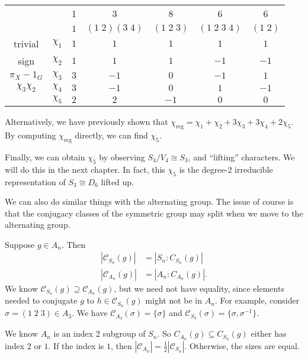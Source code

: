 \documentclass[a4paper]{article}
\begin{document}
\begin{eg}
\begin{center}
    \begin{tabular}{ccccccc}
      \toprule
      & & 1 & 3 & 8 & 6 & 6\\
      & & $1$ & $(1\; 2)(3\; 4)$ & $(1\; 2\; 3)$ & $(1\; 2\; 3\; 4)$ & $(1\; 2)$\\
      \midrule
      trivial & $\chi_1$ & $1$ & $1$ & $1$ & $1$ & $1$\\
      sign & $\chi_2$ & $1$ & $1$ & $1$ & $-1$ & $-1$\\
      $\pi_X - 1_G$ & $\chi_3$ & $3$ & $-1$ & $0$ & $-1$ & $1$\\
      $\chi_3 \chi_2$ & $\chi_4$ & $3$ & $-1$ & $0$ & $1$ & $-1$\\
      & $\chi_5$ & $2$ & $2$ & $-1$ & $0$ & $0$\\
      \bottomrule
    \end{tabular}
  \end{center}
  Alternatively, we have previously shown that $\chi_{\mathrm{reg}} = \chi_1 + \chi_2 + 3\chi_3 + 3 \chi_4 + 2\chi_5$. By computing $\chi_{\mathrm{reg}}$ directly, we can find $\chi_5$.

  Finally, we can obtain $\chi_5$ by observing $S_4 / V_4 \cong S_3$, and ``lifting'' characters. We will do this in the next chapter. In fact, this $\chi_5$ is the degree-$2$ irreducible representation of $S_3 \cong D_6$ lifted up.
\end{eg}

We can also do similar things with the alternating group. The issue of course is that the conjugacy classes of the symmetric group may split when we move to the alternating group.

Suppose $g \in A_n$. Then
\begin{align*}
  |\mathcal{C}_{S_n}(g)| &= |S_n: C_{S_n}(g)|\\
  |\mathcal{C}_{A_n}(g)| &= |A_n: C_{A_n}(g)|.
\end{align*}
We know $\mathcal{C}_{S_n}(g) \supseteq \mathcal{C}_{A_n}(g)$, but we need not have equality, since elements needed to conjugate $g$ to $h \in \mathcal{C}_{S_n}(g)$ might not be in $A_n$. For example, consider $\sigma = (1\; 2\; 3) \in A_3$. We have $\mathcal{C}_{A_3}(\sigma) = \{\sigma\}$ and $\mathcal{C}_{S_3} (\sigma) = \{\sigma, \sigma^{-1}\}$.

We know $A_n$ is an index 2 subgroup of $S_n$. So $C_{A_n}(g) \subseteq C_{S_n}(g)$ either has index $2$ or $1$. If the index is $1$, then $|\mathcal{C}_{A_n}| = \frac{1}{2}|\mathcal{C}_{S_n}|$. Otherwise, the sizes are equal.
\end{document}
